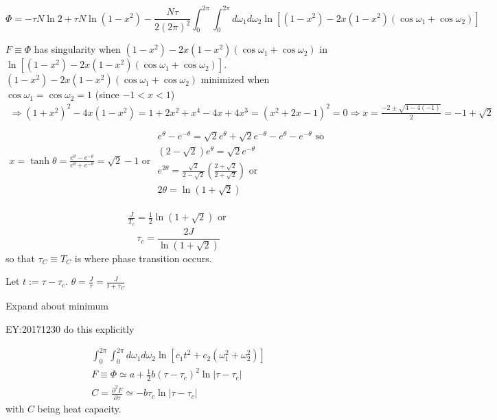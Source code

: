 \documentclass[10pt]{amsart}
\begin{document}
\begin{multicols*}{2}
\[
\Phi = -\tau N \ln{2} + \tau N \ln{ (1-x^2)} - \frac{N\tau }{ 2(2\pi)^2 } \int_0^{2\pi } \int_0^{2\pi } d\omega_1 d\omega_2 \ln{ \left[ (1-x^2) -  2x(1-x^2) \left( \cos{  \omega_1 } + \cos{  \omega_2 } \right) \right]  }
\] 

$F \equiv \Phi$ has singularity when $  (1-x^2) -  2x(1-x^2) \left( \cos{  \omega_1 } + \cos{  \omega_2 } \right)  $ in $\ln{ \left[ (1-x^2) -  2x(1-x^2) \left( \cos{  \omega_1 } + \cos{  \omega_2 } \right) \right]  }$.  \\
$  (1-x^2) -  2x(1-x^2) \left( \cos{  \omega_1 } + \cos{  \omega_2 } \right) $ minimized when $\cos{\omega_1} = \cos{\omega_2}=1$ (since $-1 < x < 1$) 
\[
\begin{gathered}
\Longrightarrow (1+x^2)^2 - 4x(1-x^2 ) = 1+2x^2 + x^4 - 4x + 4x^3 = (x^2+2x-1)^2 =0 \Longrightarrow x = \frac{-2 \pm \sqrt{ 4-4(-1) } }{2} = -1 + \sqrt{2} \\
x = \tanh{\theta} = \frac{e^{\theta} - e^{-\theta} }{ e^{\theta} + e^{-\theta} } = \sqrt{2}  -1 \text{ or } \begin{gathered}
\qquad \\ e^{\theta} - e^{-\theta} = \sqrt{2} e^{\theta} + \sqrt{2} e^{-\theta} - e^{\theta} - e^{-\theta} \text{ so } \\ 
(2-\sqrt{2}) e^{\theta} = \sqrt{2} e^{-\theta} \\
e^{2\theta} = \frac{\sqrt{2}}{ 2-\sqrt{2}} \left( \frac{2+\sqrt{2} }{ 2 + \sqrt{2}} \right) \text{ or } \\ 
2\theta = \ln{ (1+ \sqrt{2})}
\end{gathered}
\end{gathered}
\]

\[
\begin{gathered}
\frac{J}{T_c} = \frac{1}{2} \ln{ (1+\sqrt{2})} \text{ or } 
\end{gathered}
\]
\begin{equation}
\boxed{ \tau_c = \frac{2J}{ \ln{ (1+\sqrt{2}) }} }
\end{equation}
so that $\tau_C \equiv T_C$ is where phase transition occurs.  

Let $t:= \tau - \tau_c$.  $\theta = \frac{J}{\tau} = \frac{J}{t+\tau_C}$  

Expand about minimum  

EY:20171230 do this explicitly 

\[
\begin{gathered}
\int_0^{2\pi } \int_0^{2\pi} d\omega_1 d\omega_2 \ln{ [ c_1 t^2 + c_2(\omega_1^2 + \omega_2^2 )]} \\ 
F  \equiv \Phi \simeq a + \frac{1}{2} b (\tau-\tau_c)^2 \ln{ |\tau-\tau_c|} \\ 
C = \frac{ \partial^2 F}{ \partial \tau } \simeq - b\tau_c \ln{ |\tau-\tau_c| }
\end{gathered}
\]
with $C$ being heat capacity.  


\end{multicols*}
\end{document}

